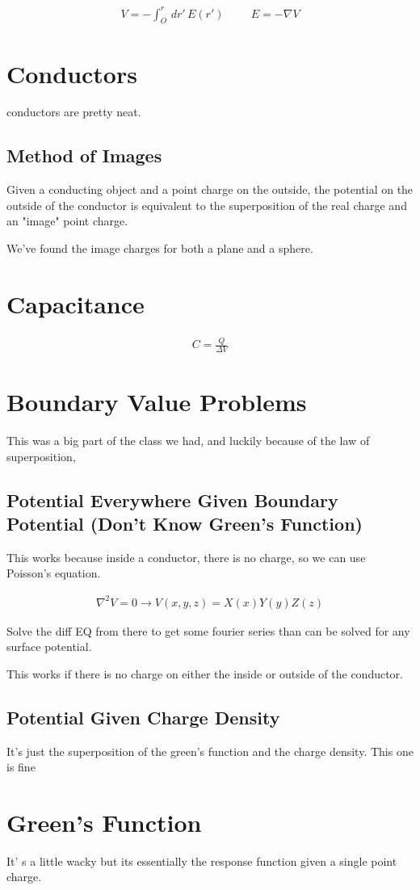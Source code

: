 \documentclass[fleqn]{report}
\newcommand{\hp}{\hspace{1cm}}
\newcommand{\equations} [1] {
\begin{gather*}
#1
\end{gather*}
}
\begin{document}
\equations{
    V = -\int^r_{O} \, dr' \, 
    E(r')
    \hp 
    E = - \nabla V
}

\section{Conductors}
conductors are pretty neat. 
\subsection{Method of Images}
Given a conducting object and a point charge on the outside, the potential 
on the outside of the conductor is equivalent to the superposition of the 
real charge and an "image" point charge. 

We've found the image charges for both a plane and a sphere. 

\section{Capacitance} 
\equations{
    C = \frac{Q}{\Delta V}
}

\section{Boundary Value Problems}
This was a big part of the class we had, and luckily because of the law of 
superposition, 

\subsection{Potential Everywhere Given Boundary Potential (Don't Know 
Green's Function)}
This works because inside a conductor, there is no charge, so we can use 
Poisson's equation.
\equations{
    \nabla^2 V = 0
    \rightarrow 
    V(x, y, z) = X(x)Y(y)Z(z)
}
Solve the diff EQ from there to get some fourier series than 
can be solved for any surface potential.

This works if there is no charge on either the inside or outside of 
the conductor.

\subsection{Potential Given Charge Density}
It's just the superposition of the green's function and the charge density. 
This one is fine 

\section{Green's Function}
It' s a little wacky but its essentially the response function given a single 
point charge.
\end{document}
